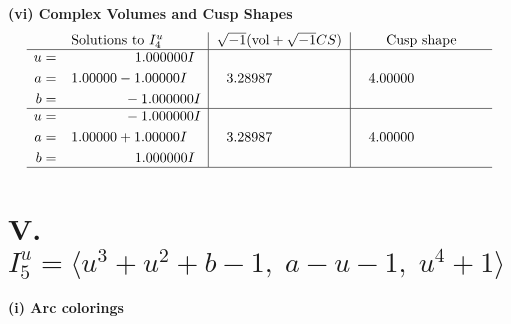 \documentclass[1p]{elsarticle_modified}
\theoremstyle{definition}
\newcommand{\I}{\sqrt{-1}}
\begin{document}
\newpage\flushleft \textbf{(vi) Complex Volumes and Cusp Shapes}
$$\begin{array}{c|c|c}  
\text{Solutions to }I^u_{4}& \I (\text{vol} + \sqrt{-1}CS) & \text{Cusp shape}\\
 \hline 
\begin{aligned}
u &= \phantom{-0.000000 -}1.000000 I \\
a &= \phantom{-}1.00000 - 1.00000 I \\
b &= \phantom{-0.000000 } -1.000000 I\end{aligned}
 & \phantom{-}3.28987\phantom{ +0.000000I} & \phantom{-}4.00000\phantom{ +0.000000I} \\ \hline\begin{aligned}
u &= \phantom{-0.000000 } -1.000000 I \\
a &= \phantom{-}1.00000 + 1.00000 I \\
b &= \phantom{-0.000000 -}1.000000 I\end{aligned}
 & \phantom{-}3.28987\phantom{ +0.000000I} & \phantom{-}4.00000\phantom{ +0.000000I}\\
 \hline 
 \end{array}$$\newpage\newpage\renewcommand{\arraystretch}{1}
\centering \section*{V. $I^u_{5}= \langle u^3+u^2+b-1,\;a- u-1,\;u^4+1 \rangle$}
\flushleft \textbf{(i) Arc colorings}\\
\end{document}
